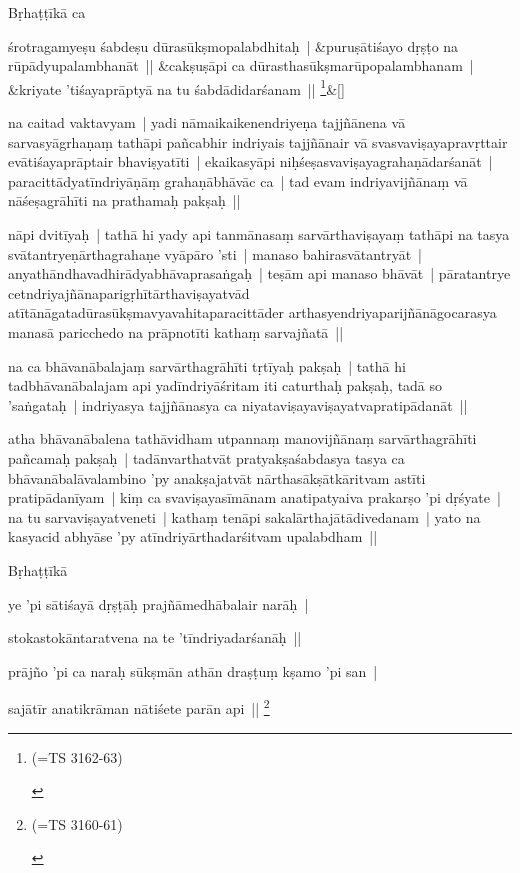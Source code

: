 \documentclass[article,12pt,a4paper]{memoir}
\newcommand{\name}[1]{#1}
\begin{document}
	

	  \pstart \name{Bṛhaṭṭīkā} ca
	\pend
      
	    
	    \stanza[\smallbreak]
	śrotragamyeṣu śabdeṣu dūrasūkṣmopalabdhitaḥ | &puruṣātiśayo dṛṣṭo na rūpādyupalambhanāt || &cakṣuṣāpi ca dūrasthasūkṣmarūpopalambhanam | &kriyate 'tiśayaprāptyā na tu śabdādidarśanam || \footnote{\begin{english}(=TS 3162-63)\end{english}}\&[\smallbreak]


	

	  \pstart na caitad vaktavyam | yadi nāmaikaikenendriyeṇa tajjñānena vā sarvasyāgrhaṇaṃ tathāpi pañcabhir indriyais tajjñānair vā svasvaviṣayapravṛttair evātiśayaprāptair bhaviṣyatīti | ekaikasyāpi niḥśeṣasvaviṣayagrahaṇādarśanāt | paracittādyatīndriyāṇāṃ grahaṇābhāvāc ca | tad evam indriyavijñānaṃ vā nāśeṣagrāhīti na prathamaḥ pakṣaḥ || 
	\pend
      

	  \pstart nāpi dvitīyaḥ | tathā hi yady api tanmānasaṃ sarvārthaviṣayaṃ tathāpi na tasya svātantryeṇārthagrahaṇe vyāpāro 'sti | manaso bahirasvātantryāt | anyathāndhavadhirādyabhāvaprasaṅgaḥ | teṣām api manaso bhāvāt | pāratantrye cetndriyajñānaparigṛhītārthaviṣayatvād atītānāgatadūrasūkṣmavyavahitaparacittāder arthasyendriyaparijñānāgocarasya manasā paricchedo na prāpnotīti kathaṃ sarvajñatā || 
	\pend
      

	  \pstart na ca bhāvanābalajaṃ sarvārthagrāhīti tṛtīyaḥ pakṣaḥ | tathā hi tadbhāvanābalajam api yadīndriyāśritam iti caturthaḥ pakṣaḥ, tadā so 'saṅgataḥ | indriyasya tajjñānasya ca niyataviṣayaviṣayatvapratipādanāt || 
	\pend
      

	  \pstart atha bhāvanābalena tathāvidham utpannaṃ manovijñānaṃ sarvārthagrāhīti pañcamaḥ pakṣaḥ | tadānvarthatvāt pratyakṣaśabdasya tasya ca bhāvanābalāvalambino 'py anakṣajatvāt nārthasākṣātkāritvam astīti pratipādanīyam | kiṃ ca svaviṣayasīmānam anatipatyaiva prakarṣo 'pi dṛśyate | na tu sarvaviṣayatveneti | kathaṃ tenāpi sakalārthajātādivedanam | yato na kasyacid abhyāse 'py atīndriyārthadarśitvam upalabdham || 
	\pend
      

	  \pstart Bṛhaṭṭīkā 
	\pend
      

	  \pstart ye 'pi sātiśayā dṛṣṭāḥ prajñāmedhābalair narāḥ | 
	\pend
      

	  \pstart stokastokāntaratvena na te 'tīndriyadarśanāḥ || 
	\pend
      

	  \pstart prājño 'pi ca naraḥ sūkṣmān athān draṣṭuṃ kṣamo 'pi san | 
	\pend
      

	  \pstart sajātīr anatikrāman nātiśete parān api || \footnote{\begin{english}(=TS 3160-61)\end{english}}
	\pend
      
\end{document}
